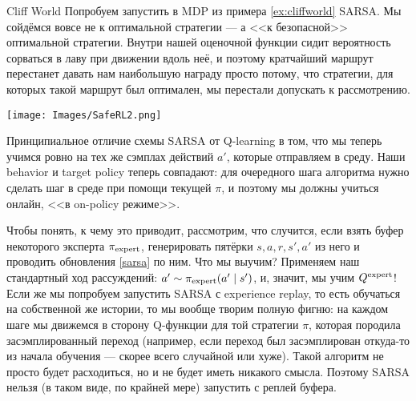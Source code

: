 \begin{exampleBox}[righthand ratio=0.35, sidebyside, sidebyside align=center, lower separated=false]{Cliff World}
Попробуем запустить в MDP из примера \ref{ex:cliffworld} SARSA. Мы сойдёмся вовсе не к оптимальной стратегии --- а <<к безопасной>> оптимальной стратегии. Внутри нашей оценочной функции сидит вероятность сорваться в лаву при движении вдоль неё, и поэтому кратчайший маршрут перестанет давать нам наибольшую награду просто потому, что стратегии, для которых такой маршрут был оптимален, мы перестали допускать к рассмотрению.

\tcblower
\texttt{[image: Images/SafeRL2.png]}
\end{exampleBox}

Принципиальное отличие схемы SARSA от Q-learning в том, что мы теперь учимся ровно на тех же сэмплах действий $a'$, которые отправляем в среду. Наши behavior и target policy теперь совпадают: для очередного шага алгоритма нужно сделать шаг в среде при помощи текущей $\pi$, и поэтому мы должны учиться онлайн, <<в on-policy режиме>>.

Чтобы понять, к чему это приводит, рассмотрим, что случится, если взять буфер некоторого эксперта $\pi_{\mathrm{expert}}$, генерировать пятёрки $s, a, r, s', a'$ из него и проводить обновления \eqref{sarsa} по ним. Что мы выучим? Применяем наш стандартный ход рассуждений: $a' \HM\sim \pi_{\expert}(a' \mid s')$, и, значит, мы учим $Q^{\mathrm{expert}}$! Если же мы попробуем запустить SARSA с experience replay, то есть обучаться на собственной же истории, то мы вообще творим полную фигню: на каждом шаге мы движемся в сторону Q-функции для той стратегии $\pi$, которая породила засэмплированный переход (например, если переход был засэмплирован откуда-то из начала обучения --- скорее всего случайной или хуже). Такой алгоритм не просто будет расходиться, но и не будет иметь никакого смысла. Поэтому SARSA нельзя (в таком виде, по крайней мере) запустить с реплей буфера.


